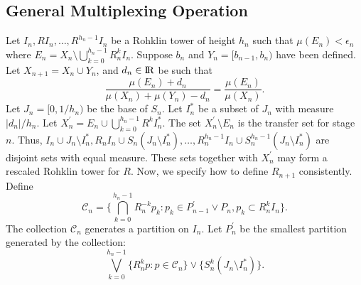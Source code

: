 \documentclass[12pt]{amsart}
\begin{document}
\subsection{General Multiplexing Operation}
Let $I_n, RI_n, \ldots ,R^{h_n-1}I_n$ be a Rohklin tower of height $h_n$ such that 
$\mu(E_n) < \epsilon_n$ where $E_n = X_n\setminus \bigcup_{k=0}^{h_n-1}R_n ^kI_n$. 
Suppose $b_n$ and $Y_n = [b_{n-1},b_n)$ have been defined.  
Let $X_{n+1} = X_n \cup Y_n$, and $d_n \in {\hbox{\rm\setbox1=\hbox{I}\copy1\kern-.45\wd1 R}}$ be such that 
\[
\frac{\mu(E_n) + d_n }{\mu(X_n)+\mu(Y_n)-d_n} = \frac{\mu(E_n)}{\mu(X_n)} . 
\]
Let $J_n=[0,{1} / {h_n})$ be the base of $S_n$. 
Let $I_n^*$ be a subset of $J_n$ with measure ${ \vert d_n \vert } / {h_n}$. 
Let $X_n^{\prime} = E_n \cup \bigcup_{k=0}^{h_n-1}R^k I_n^*$. 
The set $X_n^{\prime} \setminus E_n$ is the transfer set for stage $n$. 
Thus, $I_n\cup J_n \setminus I_n^*, R_n I_n \cup S_n (J_n \setminus I_n^*), \ldots ,
R_n^{h_n-1} I_n \cup S_n^{h_n-1} (J_n \setminus I_n^*)$ are disjoint sets with equal measure. 
These sets together with $X_n^{\prime}$ may form a rescaled Rohklin tower for $R$. 
Now, we specify how to define $R_{n+1}$ consistently. 
Define 
\[
\mathcal{C}_n=\{ \bigcap_{k=0}^{h_n-1} R_n^{-k} p_k : p_k\in P_{n-1}^{\prime} \vee P_{n}, p_k\subset R_n^{k}I_n \} . 
\]
The collection $\mathcal{C}_n$ generates a partition on $I_n$.  Let $P_{n}^{\prime}$ be the smallest 
partition generated by the collection:
\[
\bigvee_{k=0}^{h_n-1} \{ R_n^{k} p : p\in \mathcal{C}_n \} \vee \{ S_n^k (J_n\setminus I_n^*) \} . 
\] 
\end{document}
